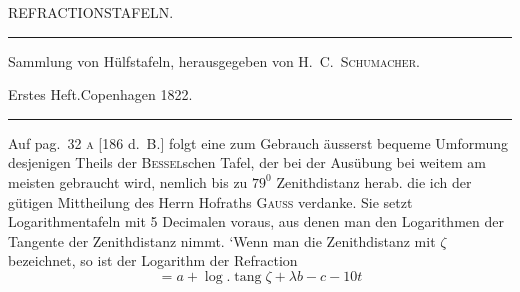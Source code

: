 \clearpage{}%
\begin{center}
{\small REFRACTIONSTAFELN.\par}
\medskip\hrule\medskip
{\small Sammlung von Hülfstafeln, herausgegeben von H.\ C.\ \textsc{Schumacher}.\par
Erstes Heft.\quad Copenhagen 1822.\par}
\medskip\hrule
\end{center}\medskip
Auf pag.\ 32 \textsc{a} [186 d.\ B.] folgt eine zum Gebrauch äusserst bequeme Umformung desjenigen Theils der \textsc{Bessel}schen Tafel, der bei der Ausübung bei weitem am meisten gebraucht wird, nemlich bis zu $79^0$ Zenithdistanz herab. die ich der gütigen Mittheilung des Herrn Hofraths \textsc{Gauss} verdanke. Sie setzt Logarithmentafeln mit 5 Decimalen voraus, aus denen man den Logarithmen der Tangente der Zenithdistanz nimmt. `Wenn man die Zenithdistanz mit $\zeta$ bezeichnet, so ist der Logarithm der Refraction
\[
=a+\log.\operatorname{tang}\zeta+\lambda b-c-10t
\]

